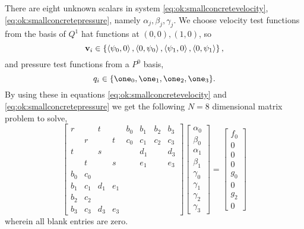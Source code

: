 There are eight unknown scalars in system \eqref{eq:ok:smallconcretevelocity}, \eqref{eq:ok:smallconcretepressure}, namely $\alpha_j,\beta_j,\gamma_j$.  We choose velocity test functions from the basis of $Q^1$ hat functions at $(0,0),(1,0)$, so
\begin{equation}
\mathbf{v}_i \in \left\{\left<\psi_0,0\right>, \left<0,\psi_0\right>, \left<\psi_1,0\right>, \left<0,\psi_1\right>\right\},  \label{eq:ok:smallvelocitytest}
\end{equation}
and pressure test functions from a $P^0$ basis,
\begin{equation}
q_i \in \{\one_0,\one_1,\one_2,\one_3\}.  \label{eq:ok:smallpressuretest}
\end{equation}
By using these in equations \eqref{eq:ok:smallconcretevelocity} and \eqref{eq:ok:smallconcretepressure} we get the following $N=8$ dimensional matrix problem to solve,
\begin{equation}
\begin{bmatrix}
r   &     & t   &     & b_0 & b_1 & b_2 & b_3 \\
    & r   &     & t   & c_0 & c_1 & c_2 & c_3 \\
t   &     & s   &     &     & d_1 &     & d_3 \\
    & t   &     & s   &     & e_1 &     & e_3 \\
b_0 & c_0 &     &     \\
b_1 & c_1 & d_1 & e_1 \\
b_2 & c_2 &     &     \\
b_3 & c_3 & d_3 & e_3
\end{bmatrix} 
\begin{bmatrix}
\alpha_0 \\ \beta_0 \\ \alpha_1 \\ \beta_1 \\ \gamma_0 \\ \gamma_1 \\ \gamma_2 \\ \gamma_3
\end{bmatrix}
=
\begin{bmatrix}
f_0 \\
0 \\
0 \\
0 \\
g_0 \\
0 \\
g_2 \\
0
\end{bmatrix}  \label{eq:ok:smallmatrixproblem}
\end{equation} 
wherein all blank entries are zero.

